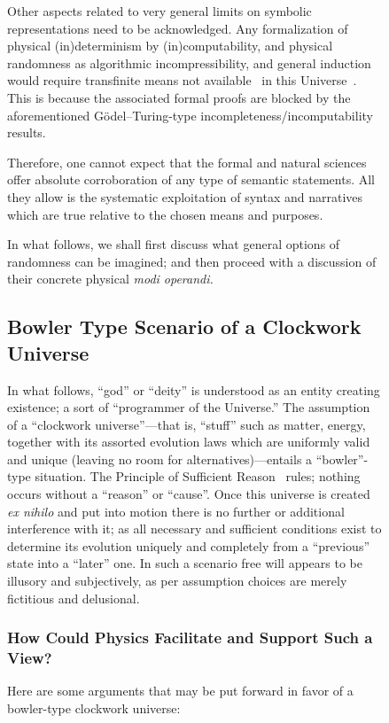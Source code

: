 \documentclass[entropy,article,accept,oneauthor,pdftex]{Definitions/mdpi}
\begin{document}
\begin{figure}[H]
Other aspects related to very general limits on symbolic representations need to be acknowledged.
Any formalization of physical (in)determinism by (in)computability,
and physical randomness as algorithmic incompressibility,
and general induction~\cite{go-67,blum75blum,angluin:83,ad-91,li:92}
would require transfinite means not available~\cite{gandy1}
in this Universe~\cite{svozil-93,svozil-unev,svozil-07-physical_unknowables}.
This is because the associated
formal proofs are blocked by the aforementioned
G\"odel--Turing-type incompleteness/incomputability results.

Therefore, one cannot expect that the formal and natural sciences
offer absolute corroboration of any type of semantic statements.
All they allow is the systematic exploitation of syntax and narratives
which are true relative to the chosen means and purposes.


In what follows, we shall first discuss what general options of randomness can be imagined;
and then proceed with a discussion of their concrete physical {\it modi operandi.}

\subsection{Bowler Type Scenario of a Clockwork Universe}

In what follows, ``god'' or ``deity'' is understood as an entity creating existence; a sort of ``programmer of the Universe.''
The assumption of a ``clockwork universe''---that is, ``stuff'' such as
matter, energy, together with its assorted evolution laws which are uniformly valid and unique
(leaving no room for alternatives)---entails a ``bowler''-type situation.
The Principle of Sufficient Reason~\cite{sep-sufficient-reason} rules; nothing occurs without a ``reason'' or ``cause''.
Once this universe is created {\it ex nihilo} and put into motion
there is no further or additional interference with it; as all necessary and sufficient conditions exist to
determine its evolution uniquely and completely from a ``previous'' state into a ``later''
one.
In such a scenario free will appears to be illusory and subjectively,
as per assumption choices are merely fictitious and
delusional.

\subsubsection{How Could Physics Facilitate and Support Such a View?}


Here are some arguments that may be put forward in favor of a bowler-type clockwork universe:


\end{figure}
\end{document}
